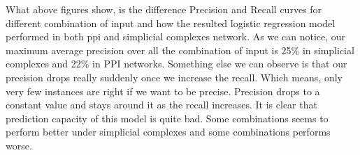 \documentclass[9pt]{article}
\begin{document}
{\begin{figure}[!htb]
\endminipage
\end{figure}
What above figures show, is the difference Precision and Recall curves for different combination of input and how the resulted logistic regression model performed in both ppi and simplicial complexes network. As we can notice, our maximum average precision over all the combination of input is 25\% in simplicial complexes and 22\% in PPI networks. Something else we can observe is that our precision drops really suddenly once we increase the recall. Which means, only very few instances are right if we want to be precise. Precision drops to a constant value and stays around it as the recall increases. It is clear that prediction capacity of this model is quite bad. Some combinations seems to perform better under simplicial complexes and some combinations performs worse.

}
\end{document}
